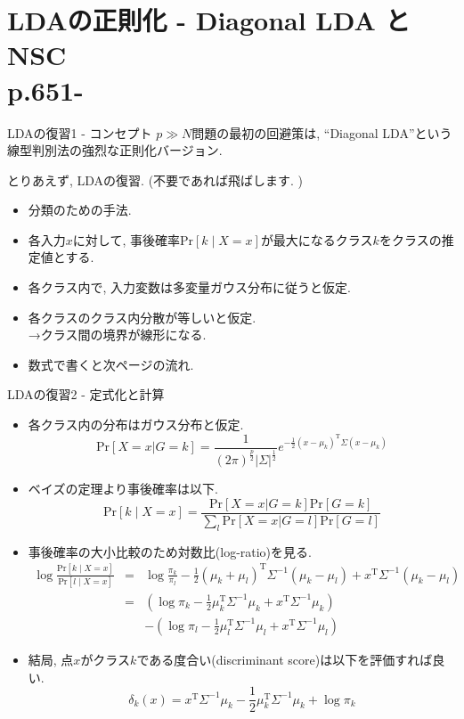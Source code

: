 \documentclass[dvipdfmx,8pt]{beamer}
\newcommand{\probability}[1]{\mathrm{Pr}[{#1}]}
\begin{document}
  \section{LDAの正則化 - Diagonal LDA と NSC\\p.651-}
  \begin{frame}{LDAの復習1 - コンセプト}
    $p\gg N$問題の最初の回避策は, ``Diagonal LDA''という線型判別法の強烈な正則化バージョン.

    とりあえず, LDAの復習. (不要であれば飛ばします. )
    \begin{itemize}
      \item 分類のための手法.
      \item 各入力$x$に対して, 事後確率$\probability{k \mid X=x}$が最大になるクラス$k$をクラスの推定値とする.
      \item 各クラス内で, 入力変数は多変量ガウス分布に従うと仮定.
      \item 各クラスのクラス内分散が等しいと仮定. \\
        →クラス間の境界が線形になる.
      \item 数式で書くと次ページの流れ.
    \end{itemize}
  \end{frame}
  \begin{frame}{LDAの復習2 - 定式化と計算}
    \begin{itemize}
      \item 各クラス内の分布はガウス分布と仮定.
        \[
          \probability{X=x | G=k}=\frac{1}{(2 \pi)^{\frac{p}{2}}|\Sigma|^{\frac{1}{2}}}e^{-\frac{1}{2}(x-\mu_k)^\mathrm{T}\Sigma(x-\mu_k)}
        \]
      \item ベイズの定理より事後確率は以下.
        \[
          \probability{k \mid X=x}=\frac{\probability{X=x | G=k}\probability{G=k}}{\sum_l\probability{X=x | G=l}\probability{G=l}}
        \]
      \item 事後確率の大小比較のため対数比(log-ratio)を見る.
        \begin{eqnarray*}
          \log \frac{\probability{k \mid X=x}}{\probability{l \mid X=x}} &=& \log \frac{\pi_k}{\pi_l}-\frac{1}{2}(\mu_k+\mu_l)^{\mathrm{T}}\Sigma^{-1}(\mu_k-\mu_l)+x^{\mathrm{T}}\Sigma^{-1}(\mu_k-\mu_l) \\
          &=& (\log\pi_k - \frac{1}{2}\mu_k^{\mathrm{T}}\Sigma^{-1}\mu_k+x^{\mathrm{T}}\Sigma^{-1}\mu_k)\\
          && - (\log\pi_l - \frac{1}{2}\mu_l^{\mathrm{T}}\Sigma^{-1}\mu_l+x^{\mathrm{T}}\Sigma^{-1}\mu_l)
        \end{eqnarray*}
      \item 結局, 点$x$がクラス$k$である度合い(discriminant score)は以下を評価すれば良い.
        \[
          \delta_k(x)=x^{\mathrm{T}}\Sigma^{-1}\mu_k-\frac{1}{2}\mu_k^{\mathrm{T}}\Sigma^{-1}\mu_k+\log\pi_k
        \]
    \end{itemize}
  \end{frame}
\end{document}
